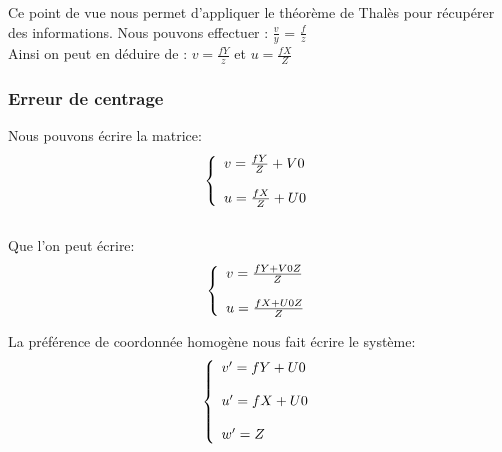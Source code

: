 \documentclass[12pt, french]{report}
\begin{document}
\begin{center}
\end{center}
Ce point de vue nous permet d'appliquer le théorème de Thalès pour récupérer des informations. Nous pouvons effectuer : $\frac{v}{y}$ = $\frac{f}{z}$ \\

Ainsi on peut en déduire de : $v=\frac{fY}{z}$ et $u=\frac{fX}{Z}$

\subsubsection{Erreur de centrage}

Nous pouvons écrire la matrice: 
$$\left\{ 
    \begin{array}{ll}
        v=\frac{fY}{Z}+V0  \\ \\
        u=\frac{fX}{Z}+U0
    \end{array} \\
\right. $$ \\

Que l'on peut écrire: 
$$\left\{ 
    \begin{array}{ll}
        v=\frac{fY+V0Z}{Z} \\ \\
        u=\frac{fX+U0Z}{Z}
    \end{array} \\
\right. $$

La préférence de coordonnée homogène nous fait écrire le système:
$$\left\{ 
    \begin{array}{ll}
        v'=fY+U0\\ \\
        u'=fX+U0 \\ \\
        w'=Z
    \end{array} \\
\right. $$
\end{document}
